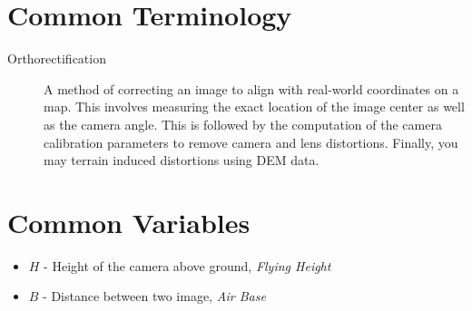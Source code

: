 \documentclass[12pt]{report}
\begin{document}
\section*{Common Terminology}

\begin{description}
\item[Orthorectification] A method of correcting an image to align with real-world coordinates on a map. 
                          This involves measuring the exact location of the image center as well as 
                          the camera angle.  This is followed by the computation of the camera calibration 
                          parameters to remove camera and lens distortions.  Finally, you may terrain
                          induced distortions using DEM data. 
\end{description}

\section*{Common Variables}

\begin{itemize}
\item $H$ - Height of the camera above ground, \emph{Flying Height}
\item $B$ - Distance between two image, \emph{Air Base}
\end{itemize}
\end{document}
